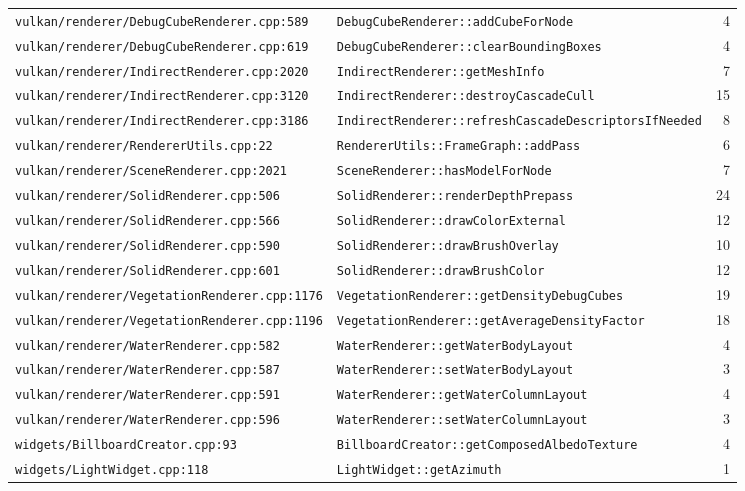 \documentclass[11pt,a4paper]{article}
\begin{document}
{\begin{longtable}{L{0.40\textwidth} L{0.48\textwidth} r}
\texttt{vulkan/renderer/DebugCubeRenderer.cpp:589} & \texttt{DebugCubeRenderer::addCubeForNode} & 4 \\
\texttt{vulkan/renderer/DebugCubeRenderer.cpp:619} & \texttt{DebugCubeRenderer::clearBoundingBoxes} & 4 \\
\texttt{vulkan/renderer/IndirectRenderer.cpp:2020} & \texttt{IndirectRenderer::getMeshInfo} & 7 \\
\texttt{vulkan/renderer/IndirectRenderer.cpp:3120} & \texttt{IndirectRenderer::destroyCascadeCull} & 15 \\
\texttt{vulkan/renderer/IndirectRenderer.cpp:3186} & \texttt{IndirectRenderer::refreshCascadeDescriptorsIfNeeded} & 8 \\
\texttt{vulkan/renderer/RendererUtils.cpp:22} & \texttt{RendererUtils::FrameGraph::addPass} & 6 \\
\texttt{vulkan/renderer/SceneRenderer.cpp:2021} & \texttt{SceneRenderer::hasModelForNode} & 7 \\
\texttt{vulkan/renderer/SolidRenderer.cpp:506} & \texttt{SolidRenderer::renderDepthPrepass} & 24 \\
\texttt{vulkan/renderer/SolidRenderer.cpp:566} & \texttt{SolidRenderer::drawColorExternal} & 12 \\
\texttt{vulkan/renderer/SolidRenderer.cpp:590} & \texttt{SolidRenderer::drawBrushOverlay} & 10 \\
\texttt{vulkan/renderer/SolidRenderer.cpp:601} & \texttt{SolidRenderer::drawBrushColor} & 12 \\
\texttt{vulkan/renderer/VegetationRenderer.cpp:1176} & \texttt{VegetationRenderer::getDensityDebugCubes} & 19 \\
\texttt{vulkan/renderer/VegetationRenderer.cpp:1196} & \texttt{VegetationRenderer::getAverageDensityFactor} & 18 \\
\texttt{vulkan/renderer/WaterRenderer.cpp:582} & \texttt{WaterRenderer::getWaterBodyLayout} & 4 \\
\texttt{vulkan/renderer/WaterRenderer.cpp:587} & \texttt{WaterRenderer::setWaterBodyLayout} & 3 \\
\texttt{vulkan/renderer/WaterRenderer.cpp:591} & \texttt{WaterRenderer::getWaterColumnLayout} & 4 \\
\texttt{vulkan/renderer/WaterRenderer.cpp:596} & \texttt{WaterRenderer::setWaterColumnLayout} & 3 \\
\texttt{widgets/BillboardCreator.cpp:93} & \texttt{BillboardCreator::getComposedAlbedoTexture} & 4 \\
\texttt{widgets/LightWidget.cpp:118} & \texttt{LightWidget::getAzimuth} & 1 \\

\end{longtable}}
\end{document}
